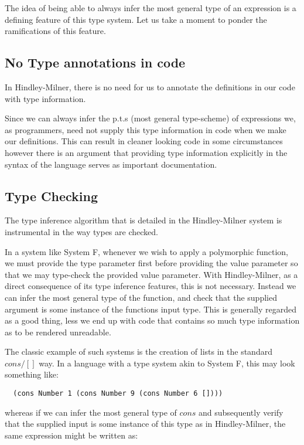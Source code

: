 The idea of being able to always infer the most general type of an
expression is a defining feature of this type system. Let us take a
moment to ponder the ramifications of this feature.

\subsection{No Type annotations in code}

In Hindley-Milner, there is no need for us to annotate the definitions
in our code with type information.

Since we can always infer the p.t.s (most general type-scheme) of
expressions we, as programmers, need not supply this type information
in code when we make our definitions. This can result in cleaner
looking code in some circumstances however there is an argument that
providing type information explicitly in the syntax of the language
serves as important documentation.

\subsection{Type Checking}

The type inference algorithm that is detailed in the Hindley-Milner
system is instrumental in the way types are checked.

In a system like System F, whenever we wish to apply a polymorphic
function, we must provide the type parameter first before providing
the value parameter so that we may type-check the provided value
parameter. With Hindley-Milner, as a direct consequence of its type
inference features, this is not necessary. Instead we can infer the
most general type of the function, and check that the supplied
argument is some instance of the functions input type. This is
generally regarded as a good thing, less we end up with code that
contains so much type information as to be rendered unreadable.

The classic example of such systems is the creation of lists in the
standard $cons/[]$ way. In a language with a type system akin to
System F, this may look
something like:

\begin{verbatim}
  (cons Number 1 (cons Number 9 (cons Number 6 [])))  
\end{verbatim}

whereas if we can infer the most general type of $cons$ and
subsequently verify that the supplied input is some instance of this
type as in Hindley-Milner, the same expression might be written as:

